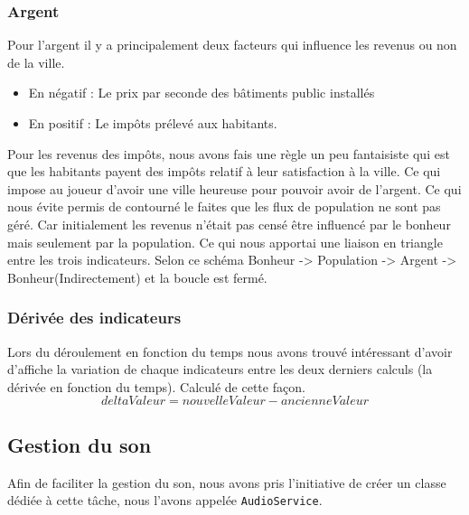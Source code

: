 \documentclass[a4paper,10pt,openany,oneside]{report}
\begin{document}
\subsubsection{Argent}
Pour l'argent il y a principalement deux facteurs qui influence les revenus ou non de la ville.
\begin{itemize}
	\item En négatif : Le prix par seconde des bâtiments public installés
	\item En positif : Le impôts prélevé aux habitants.
\end{itemize}
Pour les revenus des impôts, nous avons fais une règle un peu fantaisiste qui est que les habitants payent des impôts relatif à leur satisfaction à la ville. Ce qui impose au joueur d'avoir une ville heureuse pour pouvoir avoir de l'argent. Ce qui nous évite permis de contourné le faites que les flux de population ne sont pas géré. Car initialement les revenus n'était pas censé être influencé par le bonheur mais seulement par la population. Ce qui nous apportai une liaison en triangle entre les trois indicateurs.
Selon ce schéma Bonheur -> Population -> Argent -> Bonheur(Indirectement) et la boucle est fermé.

\subsubsection{Dérivée des indicateurs}
Lors du déroulement en fonction du temps nous avons trouvé intéressant d'avoir d'affiche la variation de chaque indicateurs entre les deux derniers calculs (la dérivée en fonction du temps). Calculé de cette façon. \[deltaValeur = nouvelleValeur - ancienneValeur\]

\subsection{Gestion du son}
Afin de faciliter la gestion du son, nous avons pris l'initiative de créer un classe dédiée à cette tâche, nous l'avons appelée \texttt{AudioService}.
\end{document}
